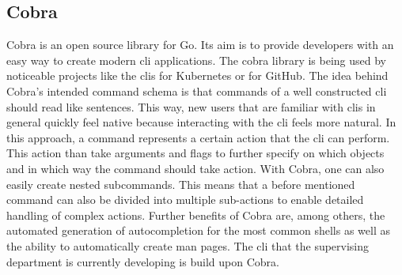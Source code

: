
\subsection{Cobra}
Cobra is an open source library for Go.
Its aim is to provide developers with an easy way to create modern \ac{cli} applications.
The cobra library is being used by noticeable projects like the \ac{cli}s for Kubernetes or for GitHub.
The idea behind Cobra's intended command schema is that commands of a well constructed \ac{cli} should read like sentences.
This way, new users that are familiar with \acp{cli} in general quickly feel native because interacting with the \ac{cli} feels more natural.
In this approach, a command represents a certain action that the \ac{cli} can perform.
This action than take arguments and flags to further specify on which objects and in which way the command should take action.
With Cobra, one can also easily create nested subcommands.
This means that a before mentioned command can also be divided into multiple sub-actions to enable detailed handling of complex actions.
Further benefits of Cobra are, among others, the automated generation of autocompletion for the most common shells as well as the ability to automatically create man pages. \cite{cobra.github, cobra.dev}
The \ac{cli} that the supervising department is currently developing is build upon Cobra.



